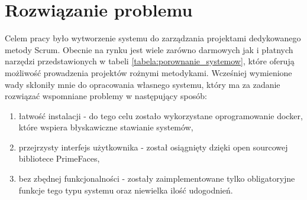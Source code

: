 \section{Rozwiązanie problemu}

Celem pracy było wytworzenie systemu do zarządzania projektami dedykowanego metody Scrum. Obecnie na rynku jest wiele zarówno darmowych jak i płatnych narzędzi przedstawionych w tabeli \ref{tabela:porownanie_systemow}, które oferują możliwość prowadzenia projektów rożnymi metodykami. Wcześniej wymienione wady skłoniły mnie do opracowania własnego systemu, który ma za zadanie rozwiązać wspomniane problemy w następujący sposób:
\begin{enumerate}
	\item łatwość instalacji - do tego celu zostało wykorzystane oprogramowanie docker, które wspiera błyskawiczne stawianie systemów,
	\item przejrzysty interfejs użytkownika - został osiągnięty dzięki open sourcowej bibliotece PrimeFaces,
	\item bez zbędnej funkcjonalności - zostały zaimplementowane tylko obligatoryjne funkcje tego typu systemu oraz niewielka ilość udogodnień.
\end{enumerate}

